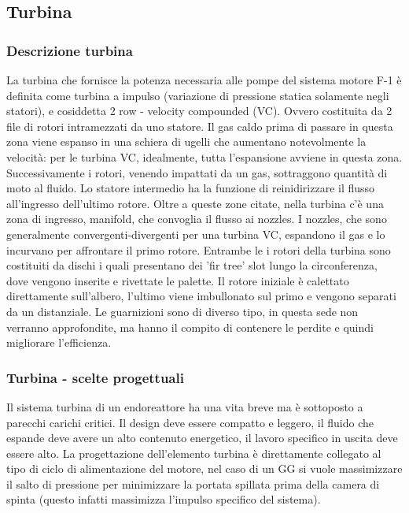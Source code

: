 \subsection{Turbina}
\label{subsec:turbina}

\subsubsection{Descrizione turbina}


La turbina che fornisce la potenza necessaria alle pompe del sistema motore F-1 è definita come turbina a impulso (variazione di pressione statica solamente negli statori), e cosiddetta 2 row - velocity compounded (VC). Ovvero costituita da 2 file di rotori intramezzati da uno statore. Il gas caldo prima di passare in questa zona viene espanso in una schiera di ugelli che aumentano notevolmente la velocità: per le turbina VC, idealmente, tutta l'espansione avviene in questa zona. Successivamente i rotori, venendo impattati da un gas, sottraggono quantità di moto al fluido. Lo statore intermedio ha la funzione di reinidirizzare il flusso all'ingresso dell'ultimo rotore. Oltre a queste zone citate, nella turbina c'è una zona di ingresso, manifold, che convoglia il flusso ai nozzles. I nozzles, che sono generalmente convergenti-divergenti per una turbina VC, espandono il gas e lo incurvano per affrontare il primo rotore. Entrambe le i rotori della turbina sono costituiti da dischi i quali presentano dei 'fir tree' slot lungo la circonferenza, dove vengono inserite e rivettate le palette. Il rotore iniziale è calettato direttamente sull'albero, l'ultimo viene imbullonato sul primo e vengono separati da un distanziale. Le guarnizioni sono di diverso tipo, in questa sede non verranno approfondite, ma hanno il compito di contenere le perdite e quindi migliorare l'efficienza. 

\subsubsection{Turbina - scelte progettuali}

Il sistema turbina di un endoreattore ha una vita breve ma è sottoposto a parecchi carichi critici. Il design deve essere compatto e leggero, il fluido che espande deve avere un alto contenuto energetico, il lavoro specifico in uscita deve essere alto. La progettazione dell'elemento turbina è direttamente collegato al tipo di ciclo di alimentazione del motore, nel caso di un GG si vuole massimizzare il salto di pressione per minimizzare la portata spillata prima della camera di spinta (questo infatti massimizza l'impulso specifico del sistema). 

